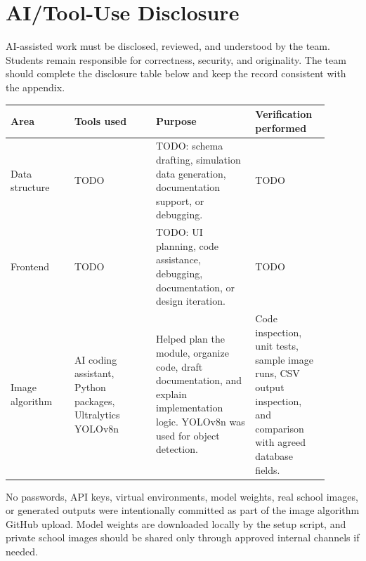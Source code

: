 \section{AI/Tool-Use Disclosure}

AI-assisted work must be disclosed, reviewed, and understood by the team. Students remain responsible for correctness, security, and originality. The team should complete the disclosure table below and keep the record consistent with the appendix.

\begin{longtable}{|p{0.18\linewidth}|p{0.23\linewidth}|p{0.29\linewidth}|p{0.20\linewidth}|}
\hline
\textbf{Area} & \textbf{Tools used} & \textbf{Purpose} & \textbf{Verification performed} \\
\hline
Data structure & TODO & TODO: schema drafting, simulation data generation, documentation support, or debugging. & TODO \\
\hline
Frontend & TODO & TODO: UI planning, code assistance, debugging, documentation, or design iteration. & TODO \\
\hline
Image algorithm & AI coding assistant, Python packages, Ultralytics YOLOv8n & Helped plan the module, organize code, draft documentation, and explain implementation logic. YOLOv8n was used for object detection. & Code inspection, unit tests, sample image runs, CSV output inspection, and comparison with agreed database fields. \\
\hline
\end{longtable}

No passwords, API keys, virtual environments, model weights, real school images, or generated outputs were intentionally committed as part of the image algorithm GitHub upload. Model weights are downloaded locally by the setup script, and private school images should be shared only through approved internal channels if needed.
